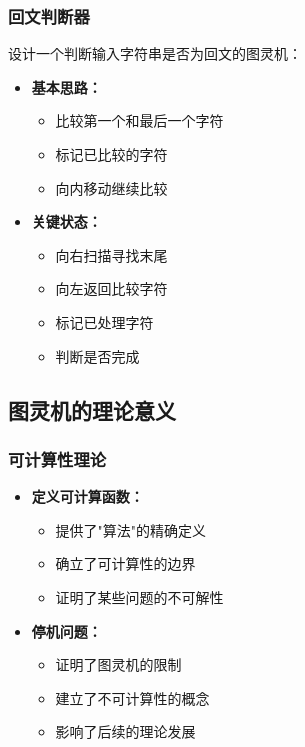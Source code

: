 \documentclass[a4paper,12pt]{ctexart}
\begin{document}
\subsubsection{回文判断器}
设计一个判断输入字符串是否为回文的图灵机：
\begin{itemize}
    \item \textbf{基本思路：}
        \begin{itemize}
            \item 比较第一个和最后一个字符
            \item 标记已比较的字符
            \item 向内移动继续比较
        \end{itemize}
    \item \textbf{关键状态：}
        \begin{itemize}
            \item 向右扫描寻找末尾
            \item 向左返回比较字符
            \item 标记已处理字符
            \item 判断是否完成
        \end{itemize}
\end{itemize}

\subsection{图灵机的理论意义}
\subsubsection{可计算性理论}
\begin{itemize}
    \item \textbf{定义可计算函数：}
        \begin{itemize}
            \item 提供了"算法"的精确定义
            \item 确立了可计算性的边界
            \item 证明了某些问题的不可解性
        \end{itemize}
    \item \textbf{停机问题：}
        \begin{itemize}
            \item 证明了图灵机的限制
            \item 建立了不可计算性的概念
            \item 影响了后续的理论发展
        \end{itemize}
\end{itemize}
\end{document}

